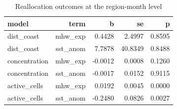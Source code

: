 \begin{table}[htbp]
\centering
\caption{Reallocation outcomes at the region-month level}
\label{tab:reloc}
\begin{tabular}{lrrrr}
\hline
model & term & b & se & p
\\ \hline
dist\_coast & mhw\_exp &  0.4428 &  2.4997 & 0.8595 \\
dist\_coast & sst\_anom &  7.7878 & 40.8349 & 0.8488 \\
concentration & mhw\_exp & -0.0012 &  0.0008 & 0.1260 \\
concentration & sst\_anom & -0.0017 &  0.0152 & 0.9115 \\
active\_cells & mhw\_exp &  0.0192 &  0.0045 & 0.0000 \\
active\_cells & sst\_anom & -0.2480 &  0.0826 & 0.0027 \\
\hline
\end{tabular}
\end{table}
